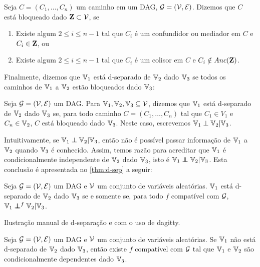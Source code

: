 \begin{definition}
 \label{def:caminho-bloq}
 Seja $C = (C_1,\ldots,C_n)$ um caminho 
 em um DAG, ${\mathcal G} = ({\mathcal V},{\mathcal E})$.
 Dizemos que $C$ está bloqueado dado ${\mathbf{Z}} \subset {\mathcal V}$, se
 \begin{enumerate}
  \item Existe algum $2 \leq i \leq n-1$ tal que
  $C_i$ é um confundidor ou mediador em $C$ e $C_{i} \in {\mathbf{Z}}$, ou
  \item Existe algum $2 \leq i \leq n-1$ tal que 
  $C_i$ é um colisor em $C$ e $C_{i} \notin Anc({\mathbf{Z}})$.
 \end{enumerate}
\end{definition}

Finalmente, dizemos que ${\mathbb V}_1$ está d-separado de ${\mathbb V}_2$
dado ${\mathbb V}_3$ se todos os caminhos de 
${\mathbb V}_1$ a ${\mathbb V}_2$ estão bloqueados dado ${\mathbb V}_3$:

\begin{definition}
 \label{def:d-sep}
 Seja ${\mathcal G} = ({\mathcal V}, {\mathcal E})$ um DAG. 
 Para ${\mathbb V}_1,{\mathbb V}_2,{\mathbb V}_3 \subseteq {\mathcal V}$, dizemos que
 ${\mathbb V}_1$ está d-separado de ${\mathbb V}_2$ dado ${\mathbb V}_3$ se,
 para todo caminho $C = (C_1,\ldots,C_n)$ tal que
 $C_1 \in V_1$ e $C_n \in {\mathbb V}_2$,
 $C$ está bloqueado dado ${\mathbb V}_3$.
 Neste caso, escrevemos ${\mathbb V}_1 \perp {\mathbb V}_2 | {\mathbb V}_3$.
\end{definition}

Intuitivamente, se ${\mathbb V}_1 \perp {\mathbb V}_2 | {\mathbb V}_3$, então 
não é possível passar informação de ${\mathbb V}_1$ a ${\mathbb V}_2$ quando
${\mathbb V}_3$ é conhecido.
Assim, temos razão para acreditar que
${\mathbb V}_1$ é condicionalmente independente de ${\mathbb V}_2$ dado ${\mathbb V}_3$,
isto é ${\mathbb V}_1 \perp\!\!\!\!\perp {\mathbb V}_2 | {\mathbb V}_3$.
Esta conclusão é apresentada no 
\cref{thm:d-sep} a seguir:

\begin{theorem}
 \label{thm:d-sep}
 Seja ${\mathcal G} = ({\mathcal V}, {\mathcal E})$ um DAG e
 ${\mathcal V}$ um conjunto de variáveis aleatórias.
 ${\mathbb V}_1$ está d-separado de ${\mathbb V}_2$ dado ${\mathbb V}_3$
 se e somente se, para todo $f$ compatível com ${\mathcal G}$,
 ${\mathbb V}_1 \perp\!\!\!\!\perp^f {\mathbb V}_2 | {\mathbb V}_3$.
\end{theorem}

\begin{example}
 Ilustração manual de d-separação e
 com o uso de dagitty.
\end{example}

\begin{lemma}
 \label{lem:d-sep}
 Seja ${\mathcal G} = ({\mathcal V}, {\mathcal E})$ um DAG e
 ${\mathcal V}$ um conjunto de variáveis aleatórias.
 Se ${\mathbb V}_1$ não está d-separado de ${\mathbb V}_2$ dado ${\mathbb V}_3$,
 então existe $f$ compatível com ${\mathcal G}$ tal que
 ${\mathbb V}_1$ e ${\mathbb V}_2$ são condicionalmente dependentes dado ${\mathbb V}_3$.
\end{lemma}

